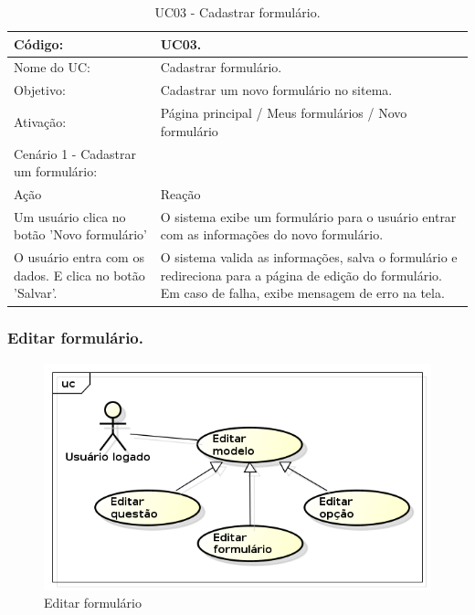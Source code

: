 \documentclass[11pt]{article}
\begin{document}
        \begin{table}[h]
          \begin{center}
            \begin{tabular}{ | p{7cm} | p{8cm} | }
              \hline
              Código: \cellcolor{gray} & UC03. \\
              \hline
              Nome do UC: \cellcolor{gray} & Cadastrar formulário. \\
              \hline
              Objetivo: \cellcolor{gray} & Cadastrar um novo formulário no sitema. \\
              \hline
              Ativação: \cellcolor{gray} & Página principal / Meus formulários / Novo formulário \\
              \hline
              \hline
              Cenário 1 - Cadastrar um formulário: &  \\
              \hline
              Ação\cellcolor{gray} & Reação\cellcolor{gray} \\
              \hline
              Um usuário clica no botão 'Novo formulário' & O sistema exibe um formulário para o usuário entrar com as informações do novo formulário. \\
              \hline
              O usuário entra com os dados. E clica no botão 'Salvar'. & O sistema valida as informações, salva o formulário e redireciona para a página de edição do formulário. Em caso de falha, exibe mensagem de erro na tela. \\
              \hline
            \end{tabular}
            \caption{UC03 - Cadastrar formulário.}
          \end{center}
        \end{table}

    \clearpage
      
      \subsubsection{Editar formulário.}

        \begin{figure}[h!]
          \centering
          \includegraphics[width=.5\textwidth]{editar.png}
          \caption{Editar formulário}
        \end{figure}
\end{document}
